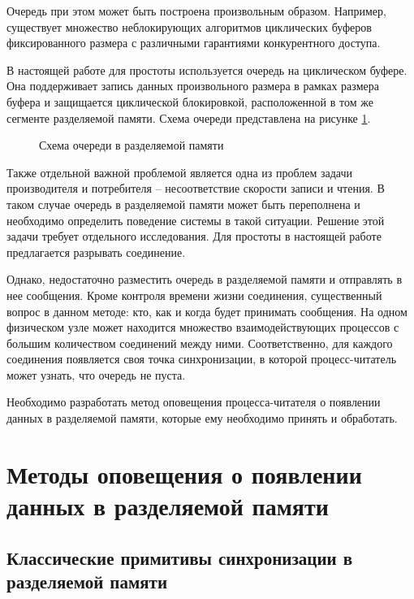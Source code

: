Очередь при этом может быть построена произвольным образом. Например, существует множество неблокирующих алгоритмов циклических буферов фиксированного размера с различными гарантиями конкурентного доступа.

В настоящей работе для простоты используется очередь на циклическом буфере. Она поддерживает запись данных произвольного размера в рамках размера буфера и защищается циклической блокировкой, расположенной в том же сегменте разделяемой памяти. Схема очереди представлена на рисунке \ref{chapter31:ShmemQueue}.

\begin{figure}[!h]
\caption{Схема очереди в разделяемой памяти}
\label{chapter31:ShmemQueue}
\end{figure}

Также отдельной важной проблемой является одна из проблем задачи производителя и потребителя -- несоответствие скорости записи и чтения. В таком случае очередь в разделяемой памяти может быть переполнена и необходимо определить поведение системы в такой ситуации. Решение этой задачи требует отдельного исследования. Для простоты в настоящей работе предлагается разрывать соединение.

Однако, недостаточно разместить очередь в разделяемой памяти и отправлять в нее сообщения. Кроме контроля времени жизни соединения, существенный вопрос в данном методе: кто, как и когда будет принимать сообщения. На одном физическом узле может находится множество взаимодействующих процессов с большим количеством соединений между ними. Соответственно, для каждого соединения появляется своя точка синхронизации, в которой процесс-читатель может узнать, что очередь не пуста.

Необходимо разработать метод оповещения процесса-читателя о появлении данных в разделяемой памяти, которые ему необходимо принять и обработать.
%
%

\section{Методы оповещения о появлении данных в разделяемой памяти}

\subsection{Классические примитивы синхронизации в разделяемой памяти}\label{chapter31:NaivePolling}


